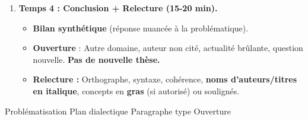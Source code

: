 \documentclass[11pt]{article}
\newcommand{\cle}[1]{{\popxbold\color{popdark}#1}}
\begin{document}
\begin{methode}
\begin{enumerate}
    \item \textbf{Temps 4 : Conclusion + Relecture (15-20 min).}
    \begin{itemize}
        \item \textbf{Bilan synthétique} (réponse nuancée à la problématique).
        \item \textbf{Ouverture} : Autre domaine, auteur non cité, actualité brûlante, question nouvelle. \textbf{Pas de nouvelle thèse.}
        \item \textbf{Relecture :} Orthographe, syntaxe, cohérence, \textbf{noms d'auteurs/titres en italique}, concepts en \textbf{gras} (si autorisé) ou soulignés.
    \end{itemize}
\end{enumerate}
\cle{Problématisation} \cle{Plan dialectique} \cle{Paragraphe type} \cle{Ouverture}
\end{methode}
\end{document}
